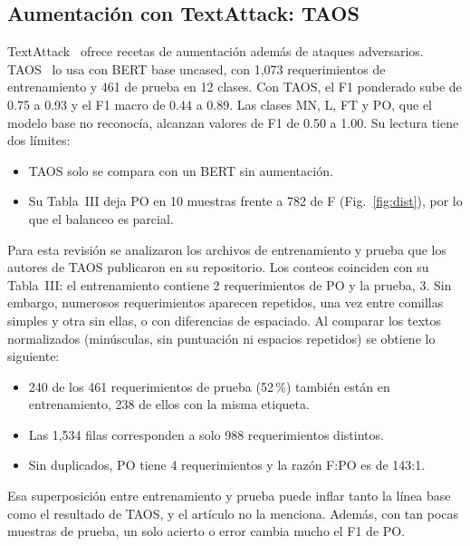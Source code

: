 \documentclass[conference]{IEEEtran}
\begin{document}
\subsection{Aumentación con TextAttack: TAOS}
TextAttack~\cite{Morris2020-TextAttack} ofrece recetas de aumentación además de ataques adversarios. TAOS~\cite{BenAmmar2025-TAOS} lo usa con BERT base uncased, con 1,073 requerimientos de entrenamiento y 461 de prueba en 12 clases. Con TAOS, el F1 ponderado sube de 0.75 a 0.93 y el F1 macro de 0.44 a 0.89. Las clases MN, L, FT y PO, que el modelo base no reconocía, alcanzan valores de F1 de 0.50 a 1.00. Su lectura tiene dos límites:
\begin{itemize}
  \item TAOS solo se compara con un BERT sin aumentación.
  \item Su Tabla~III deja PO en 10 muestras frente a 782 de F (Fig.~\ref{fig:dist}), por lo que el balanceo es parcial.
\end{itemize}
Para esta revisión se analizaron los archivos de entrenamiento y prueba que los autores de TAOS publicaron en su repositorio. Los conteos coinciden con su Tabla~III: el entrenamiento contiene 2 requerimientos de PO y la prueba, 3. Sin embargo, numerosos requerimientos aparecen repetidos, una vez entre comillas simples y otra sin ellas, o con diferencias de espaciado. Al comparar los textos normalizados (minúsculas, sin puntuación ni espacios repetidos) se obtiene lo siguiente:
\begin{itemize}
  \item 240 de los 461 requerimientos de prueba (52\,\%) también están en entrenamiento, 238 de ellos con la misma etiqueta.
  \item Las 1,534 filas corresponden a solo 988 requerimientos distintos.
  \item Sin duplicados, PO tiene 4 requerimientos y la razón F:PO es de 143:1.
\end{itemize}
Esa superposición entre entrenamiento y prueba puede inflar tanto la línea base como el resultado de TAOS, y el artículo no la menciona. Además, con tan pocas muestras de prueba, un solo acierto o error cambia mucho el F1 de PO.
\end{document}

